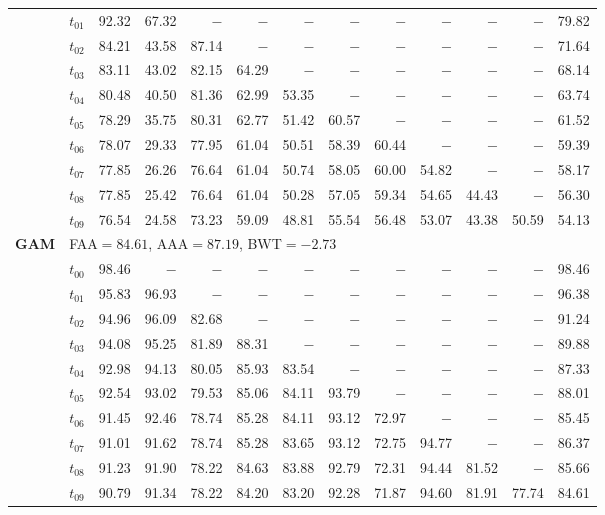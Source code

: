 \begin{table}[ht]
\begin{tabular}{@{}l l r r r r r r r r r r r@{}}
 & $t_{01}$ & 92.32 & 67.32 & $-$ & $-$ & $-$ & $-$ & $-$ & $-$ & $-$ & $-$ & 79.82 \\
 & $t_{02}$ & 84.21 & 43.58 & 87.14 & $-$ & $-$ & $-$ & $-$ & $-$ & $-$ & $-$ & 71.64 \\
 & $t_{03}$ & 83.11 & 43.02 & 82.15 & 64.29 & $-$ & $-$ & $-$ & $-$ & $-$ & $-$ & 68.14 \\
 & $t_{04}$ & 80.48 & 40.50 & 81.36 & 62.99 & 53.35 & $-$ & $-$ & $-$ & $-$ & $-$ & 63.74 \\
 & $t_{05}$ & 78.29 & 35.75 & 80.31 & 62.77 & 51.42 & 60.57 & $-$ & $-$ & $-$ & $-$ & 61.52 \\
 & $t_{06}$ & 78.07 & 29.33 & 77.95 & 61.04 & 50.51 & 58.39 & 60.44 & $-$ & $-$ & $-$ & 59.39 \\
 & $t_{07}$ & 77.85 & 26.26 & 76.64 & 61.04 & 50.74 & 58.05 & 60.00 & 54.82 & $-$ & $-$ & 58.17 \\
 & $t_{08}$ & 77.85 & 25.42 & 76.64 & 61.04 & 50.28 & 57.05 & 59.34 & 54.65 & 44.43 & $-$ & 56.30 \\
 & $t_{09}$ & 76.54 & 24.58 & 73.23 & 59.09 & 48.81 & 55.54 & 56.48 & 53.07 & 43.38 & 50.59 & 54.13 \\
\midrule
\multirow{11}{*}{\textbf{GAM}} & \multicolumn{12}{l}{\quad\small FAA$=84.61$,\; AAA$=87.19$,\; BWT$=-2.73$} \\
 & $t_{00}$ & 98.46 & $-$ & $-$ & $-$ & $-$ & $-$ & $-$ & $-$ & $-$ & $-$ & 98.46 \\
 & $t_{01}$ & 95.83 & 96.93 & $-$ & $-$ & $-$ & $-$ & $-$ & $-$ & $-$ & $-$ & 96.38 \\
 & $t_{02}$ & 94.96 & 96.09 & 82.68 & $-$ & $-$ & $-$ & $-$ & $-$ & $-$ & $-$ & 91.24 \\
 & $t_{03}$ & 94.08 & 95.25 & 81.89 & 88.31 & $-$ & $-$ & $-$ & $-$ & $-$ & $-$ & 89.88 \\
 & $t_{04}$ & 92.98 & 94.13 & 80.05 & 85.93 & 83.54 & $-$ & $-$ & $-$ & $-$ & $-$ & 87.33 \\
 & $t_{05}$ & 92.54 & 93.02 & 79.53 & 85.06 & 84.11 & 93.79 & $-$ & $-$ & $-$ & $-$ & 88.01 \\
 & $t_{06}$ & 91.45 & 92.46 & 78.74 & 85.28 & 84.11 & 93.12 & 72.97 & $-$ & $-$ & $-$ & 85.45 \\
 & $t_{07}$ & 91.01 & 91.62 & 78.74 & 85.28 & 83.65 & 93.12 & 72.75 & 94.77 & $-$ & $-$ & 86.37 \\
 & $t_{08}$ & 91.23 & 91.90 & 78.22 & 84.63 & 83.88 & 92.79 & 72.31 & 94.44 & 81.52 & $-$ & 85.66 \\
 & $t_{09}$ & 90.79 & 91.34 & 78.22 & 84.20 & 83.20 & 92.28 & 71.87 & 94.60 & 81.91 & 77.74 & 84.61 \\

\end{tabular}
\end{table}
